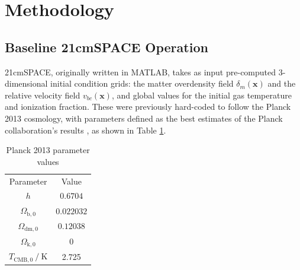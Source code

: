 \documentclass[floats,floatfix,showpacs,amssymb,prd,superscriptaddress,nofootinbib]{revtex4-2} %
\begin{document}



\newpage
\section{Methodology}
\subsection{Baseline 21cmSPACE Operation}
21cmSPACE, originally written in MATLAB, takes as input pre-computed 3-dimensional initial condition grids: the matter overdensity field $\delta_m(\textbf{x})$ and the relative velocity field $v_{bc}(\textbf{x})$, and global values for the initial gas temperature and ionization fraction. These were previously hard-coded to follow the Planck 2013 cosmology, with parameters defined as the best estimates of the Planck collaboration's results \citep{Planck2013results} , as shown in Table \ref{tab:Planck13_parameter_values}. 



\begin{table}[!h]
    \centering
    \begin{tabular}{|c|c|}
        \hline
        Parameter & Value\\ \hhline{|=|=|}
        $h$ & $0.6704$\\ \hline
        $\Omega_{\text{b}, 0}$ & $0.022032$\\ \hline
        $\Omega_{\text{dm}, 0}$ & $0.12038$\\ \hline
        $\Omega_{\text{k}, 0}$ & 0\\ \hline
        $T_{\text{CMB},0} ~ / ~ \text{K}$ & 2.725 \\ \hline
    \end{tabular}
    \caption{Planck 2013 parameter values}
    \label{tab:Planck13_parameter_values}
\end{table}
\end{document}
